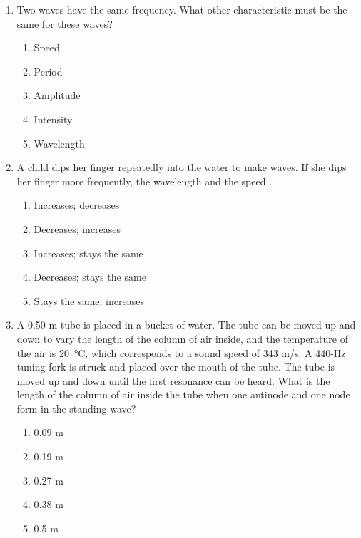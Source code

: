 \documentclass{../../../oss-apphys}
\begin{document}
\begin{multicols}{2}
\begin{enumerate}[leftmargin=18pt]
  \item Two waves have the same frequency. What other characteristic must be
    the same for these waves?
    \begin{enumerate}[nosep,leftmargin=18pt,label=(\Alph*)]
    \item Speed
    \item Period
    \item Amplitude
    \item Intensity
    \item Wavelength
    \end{enumerate}

  \item A child dips her finger repeatedly into the water to make waves. If she
    dips her finger more frequently, the wavelength \underline{\hspace{.3in}}
    and the speed \underline{\hspace{.3in}}.
    \begin{enumerate}[nosep,leftmargin=18pt,label=(\Alph*)]
    \item Increases; decreases
    \item Decreases; increases
    \item Increases; stays the same
    \item Decreases; stays the same
    \item Stays the same; increases
    \end{enumerate}
    \vspace{.7in}
    
  \item A 0.50-m tube is placed in a bucket of water. The tube can be moved
    up and down to vary the length of the column of air inside, and the
    temperature of the air is \SI{20}{\celsius}, which corresponds to a sound
    speed of 343 m/s. A 440-Hz tuning fork is struck and placed over the mouth
    of the tube. The tube is moved up and down until the first resonance can be
    heard. What is the length of the column of air inside the tube when one
    antinode and one node form in the standing wave?
    \begin{enumerate}[nosep,leftmargin=18pt,label=(\Alph*)]
    \item 0.09 m
    \item 0.19 m
    \item 0.27 m
    \item 0.38 m
    \item 0.5 m
    \end{enumerate}


\end{enumerate}
\end{multicols}
\end{document}

